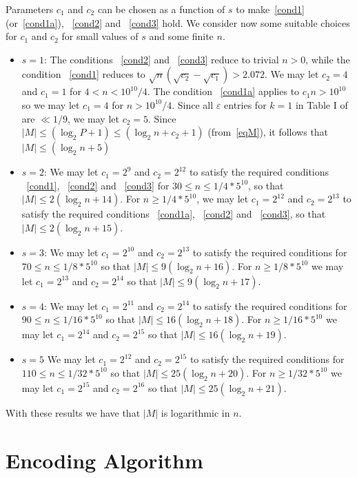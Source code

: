 Parameters $c_1$ and $c_2$ can be chosen as a function of $s$ to
make~\eqref{cond1} (or~\eqref{cond1a}), ~\eqref{cond2} and
~\eqref{cond3} hold. We consider now some suitable choices for
$c_1$ and $c_2$ for small values of $s$ and some finite $n$.
\begin{itemize}
\item $s=1$: The conditions ~\eqref{cond2} and ~\eqref{cond3}
reduce to trivial $n>0$, while the condition ~\eqref{cond1}
reduces to $\sqrt{n}(\sqrt{c_2}-\sqrt{c_1})> 2.072$. We may let
$c_2=4$ and $c_1=1$ for $4<n<10^{10}/4$. The condition
~\eqref{cond1a} applies to $c_1n>10^{10}$ so we may let $c_1=4$
 for $n>10^{10}/4$. Since all $\varepsilon$ entries for $k=1$ in Table I of \cite{rrumely}
 are $\ll 1/9$, we may let $c_2=5$. Since $|M| \leq (\log_2P+1)\leq (\log_2 n+c_2+1)$ (from~\eqref{eqM}), it
 follows that $|M| \leq (\log_2n+5)$
 \item $s=2$: We may let $c_1=2^9$ and
$c_2=2^{12}$ to satisfy the required conditions ~\eqref{cond1},
~\eqref{cond2} and ~\eqref{cond3} for $30 \leq n\leq 1/4*5^{10}$,
so that $|M| \leq 2(\log_2n+14)$. For $n \geq 1/4*5^{10}$, we may
let $c_1=2^{12}$ and $c_2=2^{13}$ to satisfy the required
conditions ~\eqref{cond1a}, ~\eqref{cond2} and ~\eqref{cond3}, so
that  $|M| \leq 2(\log_2n+15)$. \item $s=3$: We may let
$c_1=2^{10}$ and $c_2=2^{13}$ to satisfy the required conditions
for $70 \leq n\leq 1/8*5^{10}$ so that $|M| \leq 9(\log_2n+16)$.
For $n \geq 1/8*5^{10}$ we may let $c_1=2^{13}$ and $c_2=2^{14}$
so that $|M| \leq 9(\log_2n+17)$. \item $s=4$: We may let
$c_1=2^{11}$ and $c_2=2^{14}$ to satisfy the required conditions
for $90 \leq n\leq 1/16* 5^{10}$ so that $|M| \leq
16(\log_2n+18)$. For  $ n\geq 1/16* 5^{10}$ we may let
$c_1=2^{14}$ and $c_2=2^{15}$ so that $|M| \leq
16(\log_2n+19)$.\item $s=5$ We may let $c_1=2^{12}$ and
$c_2=2^{15}$ to satisfy the required conditions for $110 \leq
n\leq 1/32*5^{10}$ so that $|M| \leq 25(\log_2n+20)$. For $n \geq
1/32*5^{10}$ we may let $c_1=2^{15}$ and $c_2=2^{16}$ so that $|M|
\leq 25(\log_2n+21)$.
\end{itemize}

 With these results we have that
$|M|$ is logarithmic in $n$.


\section{Encoding Algorithm}\label{enc}

